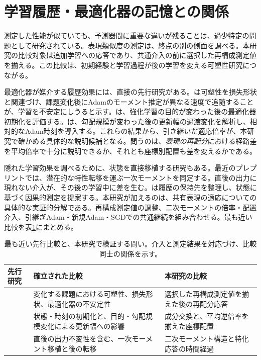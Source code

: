 \section{学習履歴・最適化器の記憶との関係}
\label{sec:related}
測定した性能が似ていても、予測器間に重要な違いが残ることは、過少特定の問題として研究されている\citep{damour2022underspecification}。表現類似度の測定は、終点の別の側面を調べる\citep{kornblith2019similarity}。本研究の比較対象は追加学習への応答であり、共通介入の前に選択した再構成測定値を揃える。この比較は、初期経験と学習過程が後の学習を変える可塑性研究につながる\citep{achille2019critical,jastrzebski2020breakeven,dohare2024plasticity}。

最適化器が媒介する履歴効果には、直接の先行研究がある。\citet{lyle2023plasticity}は可塑性を損失形状と関連づけ、課題変化後にAdamのモーメント推定が異なる速度で追随することが、学習を不安定にしうると示す。\citet{asadi2023resetting}は、強化学習の目的が変わった後の最適化器初期化を評価する。\citet{ellis2024local}は、勾配規模が変わった後の更新幅の過渡変化を解析し、相対的なAdam時刻を導入する。これらの結果から、引き継いだ適応倍率が、本研究で確かめる具体的な説明候補となる。問うのは、\emph{表現の再配分}における経路差を平均倍率で十分に説明できるか、それとも座標別配置も差を変えるかである。

隠れた学習効果を調べるために、状態を直接移植する研究もある。最近のプレプリントで\citet{xu2026optimizer}は、潜在的な特性転移を運ぶ一次モーメントを同定する。直後の出力に現れない介入が、その後の学習中に差を生む。\citet{sevetlidis2026trainingmemory}は履歴の保持先を整理し、状態に基づく因果的測定を提案する。本研究が加えるのは、共有表現の適応についての具体的な実証的分解である。再構成測定値の調整、二次モーメントの倍率・配置介入、引継ぎAdam・新規Adam・SGDでの共通継続を組み合わせる。最も近い比較を表\ref{tab:prior}にまとめる。

\begin{table}[t]
\centering\small
\caption{最も近い先行比較と、本研究で検証する問い。介入と測定結果を対応づけ、比較同士の関係を示す。}
\label{tab:prior}
\begin{tabularx}{\textwidth}{>{\raggedright\arraybackslash}p{}>{\raggedright\arraybackslash}X>{\raggedright\arraybackslash}X}
\toprule
先行研究 & 確立された比較 & 本研究の比較\\
\midrule
\citet{lyle2023plasticity} & 変化する課題における可塑性、損失形状、最適化器の不安定性 & 選択した再構成測定値を揃えた後の再配分応答\\
\citet{asadi2023resetting,ellis2024local} & 状態・時刻の初期化と、目的・勾配規模変化による更新幅への影響 & 成分交換と、平均逆倍率を揃えた座標配置\\
\citet{xu2026optimizer} & 直後の出力不変性を含む、一次モーメント移植と後の転移 & 二次モーメント構造と特化応答の時間経過\\
\bottomrule
\end{tabularx}
\end{table}

